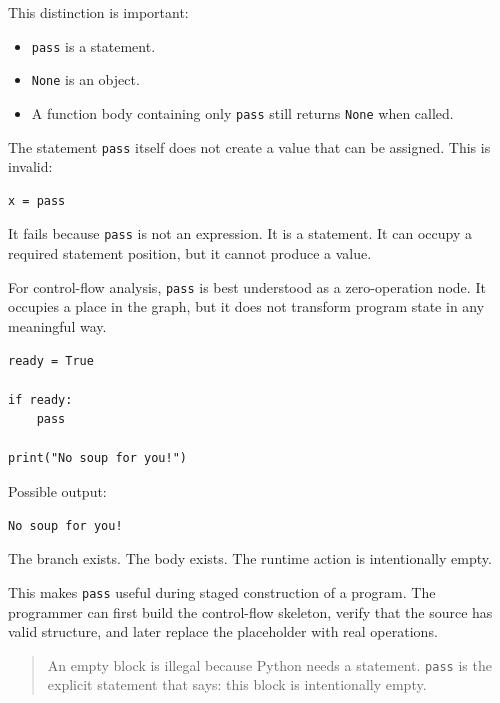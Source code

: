 This distinction is important:

\begin{itemize}
    \item \texttt{pass} is a statement.
    \item \texttt{None} is an object.
    \item A function body containing only \texttt{pass} still returns \texttt{None} when called.
\end{itemize}

The statement \texttt{pass} itself does not create a value that can be assigned. This is invalid:

\begin{verbatim}
x = pass
\end{verbatim}

It fails because \texttt{pass} is not an expression. It is a statement. It can occupy a required statement position, but it cannot produce a value.

For control-flow analysis, \texttt{pass} is best understood as a zero-operation node. It occupies a place in the graph, but it does not transform program state in any meaningful way.

\begin{verbatim}
ready = True

if ready:
    pass

print("No soup for you!")
\end{verbatim}

Possible output:

\begin{verbatim}
No soup for you!
\end{verbatim}

The branch exists. The body exists. The runtime action is intentionally empty.

This makes \texttt{pass} useful during staged construction of a program. The programmer can first build the control-flow skeleton, verify that the source has valid structure, and later replace the placeholder with real operations.

\begin{quote}
An empty block is illegal because Python needs a statement. \texttt{pass} is the explicit statement that says: this block is intentionally empty.
\end{quote}